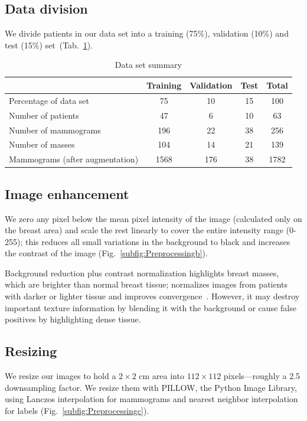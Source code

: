 \subsection{Data division}
We divide patients in our data set into a training (75\%), validation (10\%) and test (15\%) set~(Tab.~\ref{tab:DataSetSummary}).

\begin{table}[h]
	\centering
	\begin{tabular}{lcccc}
		\hline
		&\textbf{Training} & \textbf{Validation} & \textbf{Test} & \textbf{Total}\\
		\hline 
		Percentage of data set	&75	&10	&15	&100\\
		Number of patients 	&47	&6	&10	&63\\
		Number of mammograms 	&196	&22	&38	&256\\
		Number of masses 	&104	&14	&21	&139\\
		Mammograms (after augmentation) &1568 &176 &38	&1782\\
		\hline
	\end{tabular}
	\caption[Data set summary]{Data set summary}
	\label{tab:DataSetSummary}
\end{table}

\subsection{Image enhancement}
We zero any pixel below the mean pixel intensity of the image (calculated only on the breast area) and scale the rest linearly to cover the entire intensity range (0-255); this reduces all small variations in the background to black and increases the contrast of the image (Fig.~\ref{subfig:Preprocessingb}).

Background reduction plus contrast normalization highlights breast masses, which are brighter than normal breast tissue; normalizes images from patients with darker or lighter tissue and improves convergence~\cite{Arevalo2016}. However, it may destroy important texture information by blending it with the background or cause false positives by highlighting dense tissue.

\subsection{Resizing}
We resize our images to hold a $2 \times 2$ cm area into $112 \times 112$ pixels---roughly a 2.5 downsampling factor.
We resize them with PILLOW, the Python Image Library, using Lanczos interpolation for mammograms and nearest neighbor interpolation for labels (Fig.~\ref{subfig:Preprocessingc}).

